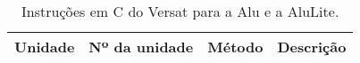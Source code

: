 \begin{table}[!htbp]
  \begin{center}
   \caption{Instruções em C do Versat para a Alu e a AluLite.}
  \centering
    \begin{tabular}{|p{1.5cm}|p{1cm}|p{5cm}|p{5cm}|}
    \hline 
    
    {\bf Unidade} & {\bf Nº da unidade} & {\bf Método} & {\bf Descrição} \\
    \hline
    \end{tabular}
  \label{tab:de_ctr_reg}
  \end{center}
\end{table}


